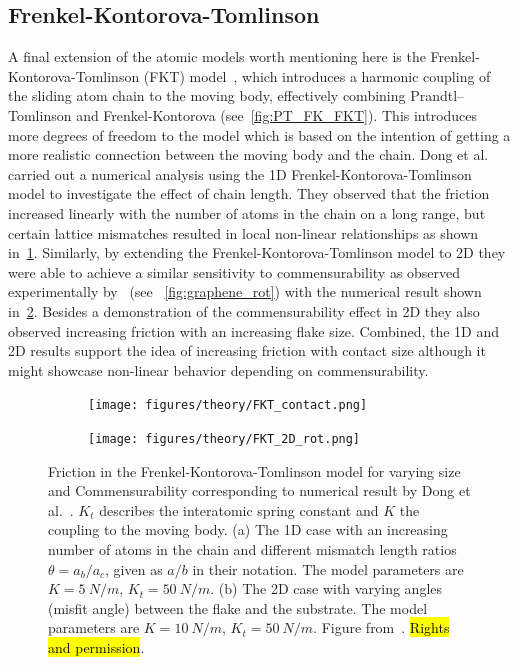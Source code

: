 \subsection{Frenkel-Kontorova-Tomlinson}
A final extension of the atomic models worth mentioning here is the
Frenkel-Kontorova-Tomlinson (\acrshort{FKT}) model~\cite{weiss_dry_1997}, which
introduces a harmonic coupling of the sliding atom chain to the moving body,
effectively combining Prandtl–Tomlinson and Frenkel-Kontorova
(see~\cref{fig:PT_FK_FKT}). This introduces more degrees of freedom to the model
which is based on the intention of getting a more realistic connection between
the moving body and the chain. Dong et al.~\cite{Yalin_2011} carried out a numerical analysis
using the 1D Frenkel-Kontorova-Tomlinson model to investigate the effect of
chain length. They observed that the friction increased linearly with the number
of atoms in the chain on a long range, but certain lattice mismatches resulted in
local non-linear relationships as shown in~\cref{fig:FKT_contact}. Similarly, by
extending the Frenkel-Kontorova-Tomlinson model to 2D they were able to achieve
a similar sensitivity to commensurability as observed experimentally
by~\cite{DIENWIEBEL2005197} (see ~\cref{fig:graphene_rot}) with the numerical
result shown in~\cref{fig:FKT_2D_rot}. Besides a demonstration of the
commensurability effect in 2D they also observed increasing friction with an
increasing flake size. Combined, the 1D and 2D results support the idea of
increasing friction with contact size although it might showcase non-linear
behavior depending on commensurability.


\begin{figure}[H]
  \centering
  \begin{subfigure}[t]{0.49\textwidth}
      \centering
      \texttt{[image: figures/theory/FKT\_contact.png]}
      \label{fig:FKT_contact}
  \end{subfigure}
  \hfill
  \begin{subfigure}[t]{0.49\textwidth}
      \centering
      \texttt{[image: figures/theory/FKT\_2D\_rot.png]}
      \label{fig:FKT_2D_rot}
    \end{subfigure}
    \hfill
     \caption{Friction in the Frenkel-Kontorova-Tomlinson model for varying size and Commensurability corresponding to numerical result by Dong et al.~\cite{Yalin_2011}. $K_t$ describes the interatomic spring constant and $K$ the coupling to the moving body. (a) The 1D case with an increasing number of atoms in the chain and different mismatch length ratios $\theta = a_b / a_c$, given as $a/b$ in their notation. The model parameters are $K = \SI{5}{N/m}$, $K_t = \SI{50}{N/m}$. (b) The 2D case with varying angles (misfit angle) between the flake and the substrate. The model parameters are $K = \SI{10}{N/m}$, $K_t = \SI{50}{N/m}$. Figure from~\cite{Yalin_2011}. \hl{Rights and permission}.}
     \label{fig:FKT_size}
\end{figure}


